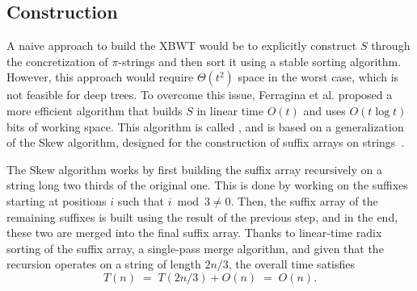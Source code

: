 \subsection{Construction}
A naive approach to build the XBWT would be to explicitly construct $S$ through the concretization of $\pi$-strings and then sort it using a stable sorting algorithm. However, this approach would require $\Theta(t^2)$ space in the worst case, which is not feasible for deep trees. To overcome this issue, Ferragina et al. \cite{ferragina2009compressing} proposed a more efficient algorithm that builds $S$ in linear time $O(t)$ and uses $O(t \log t)$ bits of working space.
This algorithm is called {\pathsort}, and is based on a generalization of the Skew algorithm, designed for the construction of suffix arrays on strings~\cite{karkkainen2006linear}.

The Skew algorithm works by first building the suffix array recursively on a string long two thirds of the original one.
This is done by working on the suffixes starting at positions $i$ such that $i \bmod 3 \neq 0$. 
Then, the suffix array of the remaining suffixes is built using the result of the previous step, and in the end, these two are merged into the final suffix array.
Thanks to linear-time radix sorting of the suffix array, a single-pass merge algorithm, and given that the recursion operates on a string of length $2n/3$, the overall time satisfies
\[
T(n) \;=\; T(2n/3) + O(n) \;=\; O(n).
\]

